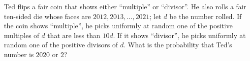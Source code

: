 Ted flips a fair coin that shows either ``multiple'' or ``divisor''. He also rolls a fair ten-sided die whose faces are $2012,2013,\dots,2021$; let $d$ be the number rolled. If the coin shows ``multiple'', he picks uniformly at random one of the positive multiples of $d$ that are less than $10d$. If it shows ``divisor'', he picks uniformly at random one of the positive divisors of $d$. What is the probability that Ted's number is $2020$ or $2$?
